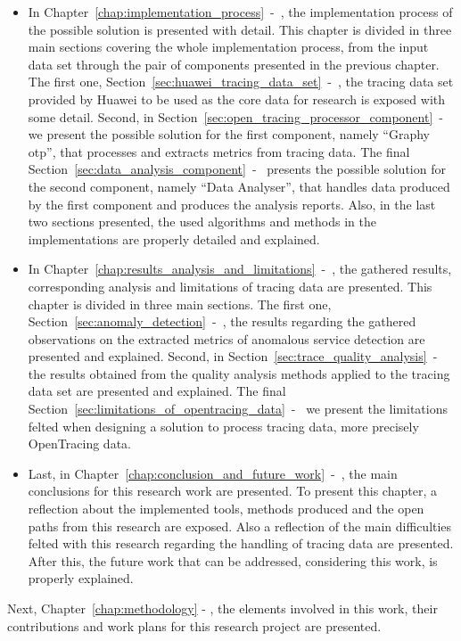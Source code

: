 \begin{itemize}
    \item In Chapter~\ref{chap:implementation_process}~-~, the implementation process of the possible solution is presented with detail. This chapter is divided in three main sections covering the whole implementation process, from the input data set through the pair of components presented in the previous chapter. The first one, Section~\ref{sec:huawei_tracing_data_set}~-~, the tracing data set provided by Huawei to be used as the core data for research is exposed with some detail. Second, in Section~\ref{sec:open_tracing_processor_component}~-~ we present the possible solution for the first component, namely ``Graphy \gls{otp}'', that processes and extracts metrics from tracing data. The final Section~\ref{sec:data_analysis_component}~-~ presents the possible solution for the second component, namely ``Data Analyser'', that handles data produced by the first component and produces the analysis reports. Also, in the last two sections presented, the used algorithms and methods in the implementations are properly detailed and explained.
    \item In Chapter~\ref{chap:results_analysis_and_limitations}~-~, the gathered results, corresponding analysis and limitations of tracing data are presented. This chapter is divided in three main sections. The first one, Section~\ref{sec:anomaly_detection}~-~, the results regarding the gathered observations on the extracted metrics of anomalous service detection are presented and explained. Second, in Section~\ref{sec:trace_quality_analysis}~-~ the results obtained from the quality analysis methods applied to the tracing data set are presented and explained. The final Section~\ref{sec:limitations_of_opentracing_data}~-~ we present the limitations felted when designing a solution to process tracing data, more precisely OpenTracing data.
    \item Last, in Chapter~\ref{chap:conclusion_and_future_work}~-~, the main conclusions for this research work are presented. To present this chapter, a reflection about the implemented tools, methods produced and the open paths from this research are exposed. Also a reflection of the main difficulties felted with this research regarding the handling of tracing data are presented. After this, the future work that can be addressed, considering this work, is properly explained.
\end{itemize}

Next, Chapter~\ref{chap:methodology} - , the elements involved in this work, their contributions and work plans for this research project are presented.

\checkoddpage
{}
{ %
    \newpage
    \blankpage}
{ %
}